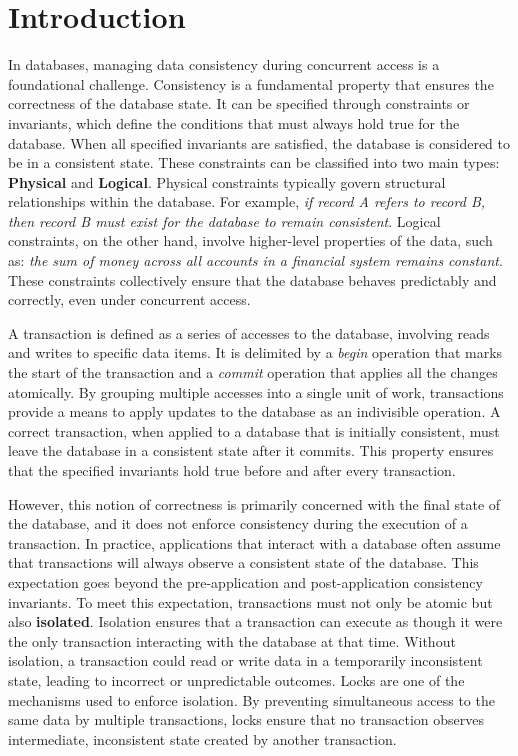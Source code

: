 %


\chapter{Introduction}
\adjustmtc



In databases, managing data consistency during concurrent access is a foundational challenge. Consistency is a fundamental property that ensures the correctness of the database state. It can be specified through constraints or invariants, which define the conditions that must always hold true for the database. When all specified invariants are satisfied, the database is considered to be in a consistent state. These constraints can be classified into two main types: \textbf{Physical} and \textbf{Logical}. Physical constraints typically govern structural relationships within the database. For example, \emph{if record A refers to record B, then record B must exist for the database to remain consistent}. Logical constraints, on the other hand, involve higher-level properties of the data, such as: \emph{the sum of money across all accounts in a financial system remains constant}. These constraints collectively ensure that the database behaves predictably and correctly, even under concurrent access.

A transaction is defined as a series of accesses to the database, involving reads and writes to specific data items. It is delimited by a \emph{begin} operation that marks the start of the transaction and a \emph{commit} operation that applies all the changes atomically. By grouping multiple accesses into a single unit of work, transactions provide a means to apply updates to the database as an indivisible operation. A correct transaction, when applied to a database that is initially consistent, must leave the database in a consistent state after it commits. This property ensures that the specified invariants hold true before and after every transaction.

However, this notion of correctness is primarily concerned with the final state of the database, and it does not enforce consistency during the execution of a transaction. In practice, applications that interact with a database often assume that transactions will always observe a consistent state of the database. This expectation goes beyond the pre-application and post-application consistency invariants. To meet this expectation, transactions must not only be atomic but also \textbf{isolated}. Isolation ensures that a transaction can execute as though it were the only transaction interacting with the database at that time. Without isolation, a transaction could read or write data in a temporarily inconsistent state, leading to incorrect or unpredictable outcomes. Locks are one of the mechanisms used to enforce isolation. By preventing simultaneous access to the same data by multiple transactions, locks ensure that no transaction observes intermediate, inconsistent state created by another transaction.

